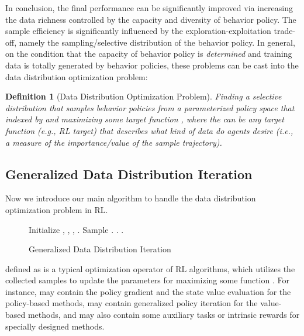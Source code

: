 \documentclass[nohyperref]{article}
\theoremstyle{plain}
\newtheorem{definition}{Definition}[section]
\begin{document}
In conclusion, the final performance can be significantly improved via increasing the data richness controlled by  the capacity and diversity of behavior policy. The sample efficiency is significantly influenced by the exploration-exploitation trade-off, namely the sampling/selective distribution  of the behavior policy. In general, on the condition that the capacity of behavior policy is \emph{determined} and training data is totally generated by behavior policies, these problems can be cast into  the data distribution optimization problem:

\begin{definition}[Data Distribution Optimization Problem] \label{Data Distribution Optimization Problem} Finding a selective distribution  that samples behavior policies  from a parameterized policy space that indexed by  and maximizing some target function , where the  can be any target function (e.g., RL target) that describes what kind of data do agents desire (i.e., a measure of the importance/value of the sample trajectory).
\end{definition}

 \subsection{Generalized Data Distribution Iteration}
 \label{sec: Generalized Data Distribution Iteration}
 Now we introduce our main algorithm to handle the data distribution optimization problem in RL.

\begin{figure}[ht]
  \centering
  \begin{minipage}{\linewidth}
    \begin{algorithm}[H]
      \caption{Generalized Data Distribution Iteration}  
          \begin{algorithmic}
            \STATE Initialize , , , .
            \FOR{}
                \STATE Sample . 
                \STATE .  
                \STATE . 
            \ENDFOR
          \end{algorithmic}
        \label{alg:GDI}
    \end{algorithm}
  \end{minipage}
\end{figure}

 defined as 
is a typical optimization operator of RL algorithms, 
which utilizes the collected samples to update the parameters for maximizing some function .
For instance,  may contain the policy gradient and the state value evaluation for the policy-based methods, 
may contain generalized policy iteration for the value-based methods, 
and may also contain some auxiliary tasks or intrinsic rewards for specially designed methods.
\end{document}
